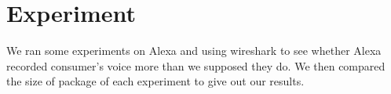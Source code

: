 
%
%
%
%
%

\section{Experiment}

We ran some experiments on Alexa and using wireshark to see whether Alexa recorded consumer's voice more than we supposed they do. We then compared the size of package of each experiment to give out our results.

